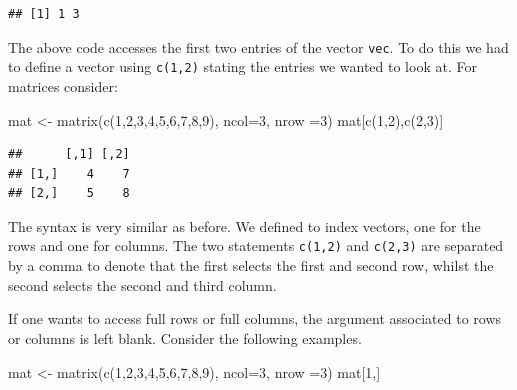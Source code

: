 \documentclass[
]{book}
\newenvironment{Shaded}{\begin{snugshade}}{\end{snugshade}}
\newcommand{\AttributeTok}[1]{\textcolor[rgb]{0.77,0.63,0.00}{#1}}
\newcommand{\DecValTok}[1]{\textcolor[rgb]{0.00,0.00,0.81}{#1}}
\newcommand{\FunctionTok}[1]{\textcolor[rgb]{0.00,0.00,0.00}{#1}}
\newcommand{\NormalTok}[1]{#1}
\newcommand{\OtherTok}[1]{\textcolor[rgb]{0.56,0.35,0.01}{#1}}
\begin{document}
\begin{verbatim}
## [1] 1 3
\end{verbatim}

The above code accesses the first two entries of the vector \texttt{vec}. To do this we had to define a vector using \texttt{c(1,2)} stating the entries we wanted to look at. For matrices consider:

\begin{Shaded}
\begin{Highlighting}[]
\NormalTok{mat }\OtherTok{\textless{}{-}} \FunctionTok{matrix}\NormalTok{(}\FunctionTok{c}\NormalTok{(}\DecValTok{1}\NormalTok{,}\DecValTok{2}\NormalTok{,}\DecValTok{3}\NormalTok{,}\DecValTok{4}\NormalTok{,}\DecValTok{5}\NormalTok{,}\DecValTok{6}\NormalTok{,}\DecValTok{7}\NormalTok{,}\DecValTok{8}\NormalTok{,}\DecValTok{9}\NormalTok{), }\AttributeTok{ncol=}\DecValTok{3}\NormalTok{, }\AttributeTok{nrow =}\DecValTok{3}\NormalTok{)}
\NormalTok{mat[}\FunctionTok{c}\NormalTok{(}\DecValTok{1}\NormalTok{,}\DecValTok{2}\NormalTok{),}\FunctionTok{c}\NormalTok{(}\DecValTok{2}\NormalTok{,}\DecValTok{3}\NormalTok{)]}
\end{Highlighting}
\end{Shaded}

\begin{verbatim}
##      [,1] [,2]
## [1,]    4    7
## [2,]    5    8
\end{verbatim}

The syntax is very similar as before. We defined to index vectors, one for the rows and one for columns. The two statements \texttt{c(1,2)} and \texttt{c(2,3)} are separated by a comma to denote that the first selects the first and second row, whilst the second selects the second and third column.

If one wants to access full rows or full columns, the argument associated to rows or columns is left blank. Consider the following examples.

\begin{Shaded}
\begin{Highlighting}[]
\NormalTok{mat }\OtherTok{\textless{}{-}} \FunctionTok{matrix}\NormalTok{(}\FunctionTok{c}\NormalTok{(}\DecValTok{1}\NormalTok{,}\DecValTok{2}\NormalTok{,}\DecValTok{3}\NormalTok{,}\DecValTok{4}\NormalTok{,}\DecValTok{5}\NormalTok{,}\DecValTok{6}\NormalTok{,}\DecValTok{7}\NormalTok{,}\DecValTok{8}\NormalTok{,}\DecValTok{9}\NormalTok{), }\AttributeTok{ncol=}\DecValTok{3}\NormalTok{, }\AttributeTok{nrow =}\DecValTok{3}\NormalTok{)}
\NormalTok{mat[}\DecValTok{1}\NormalTok{,]}
\end{Highlighting}
\end{Shaded}
\end{document}
